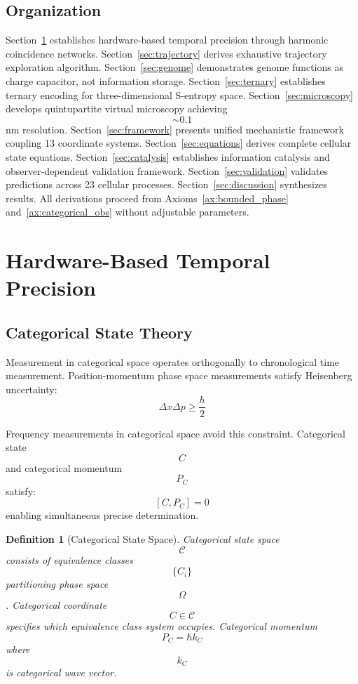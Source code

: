 \documentclass[11pt,twocolumn,a4paper]{article}
\newtheorem{definition}[theorem]{Definition}
\theoremstyle{remark}
\begin{document}
\subsection{Organization}

Section~\ref{sec:hardware} establishes hardware-based temporal precision through harmonic coincidence networks. Section~\ref{sec:trajectory} derives exhaustive trajectory exploration algorithm. Section~\ref{sec:genome} demonstrates genome functions as charge capacitor, not information storage. Section~\ref{sec:ternary} establishes ternary encoding for three-dimensional S-entropy space. Section~\ref{sec:microscopy} develops quintupartite virtual microscopy achieving $$\sim 0.1$$ nm resolution. Section~\ref{sec:framework} presents unified mechanistic framework coupling 13 coordinate systems. Section~\ref{sec:equations} derives complete cellular state equations. Section~\ref{sec:catalysis} establishes information catalysis and observer-dependent validation framework. Section~\ref{sec:validation} validates predictions across 23 cellular processes. Section~\ref{sec:discussion} synthesizes results. All derivations proceed from Axioms~\ref{ax:bounded_phase} and~\ref{ax:categorical_obs} without adjustable parameters.

\section{Hardware-Based Temporal Precision}
\label{sec:hardware}

\subsection{Categorical State Theory}

Measurement in categorical space operates orthogonally to chronological time measurement. Position-momentum phase space measurements satisfy Heisenberg uncertainty:
$$
\Delta x \Delta p \geq \frac{\hbar}{2}
$$

Frequency measurements in categorical space avoid this constraint. Categorical state $$C$$ and categorical momentum $$P_C$$ satisfy:
$$
[C, P_C] = 0
$$
enabling simultaneous precise determination.

\begin{definition}[Categorical State Space]
\label{def:categorical_space}
Categorical state space $$\mathcal{C}$$ consists of equivalence classes $$\{C_i\}$$ partitioning phase space $$\Omega$$. Categorical coordinate $$C \in \mathcal{C}$$ specifies which equivalence class system occupies. Categorical momentum $$P_C = \hbar k_C$$ where $$k_C$$ is categorical wave vector.
\end{definition}
\end{document}
